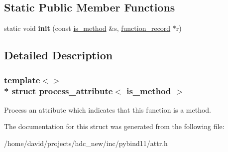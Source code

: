 \subsection*{Static Public Member Functions}
\begin{DoxyCompactItemize}
\item 
static void {\bfseries init} (const \hyperlink{structis__method}{is\+\_\+method} \&s, \hyperlink{structfunction__record}{function\+\_\+record} $\ast$r)\hypertarget{structprocess__attribute_3_01is__method_01_4_a98ee80635d5dde17c53ce800e08c2a04}{}\label{structprocess__attribute_3_01is__method_01_4_a98ee80635d5dde17c53ce800e08c2a04}

\end{DoxyCompactItemize}


\subsection{Detailed Description}
\subsubsection*{template$<$$>$\\*
struct process\+\_\+attribute$<$ is\+\_\+method $>$}

Process an attribute which indicates that this function is a method. 

The documentation for this struct was generated from the following file\+:\begin{DoxyCompactItemize}
\item 
/home/david/projects/hdc\+\_\+new/inc/pybind11/attr.\+h\end{DoxyCompactItemize}
